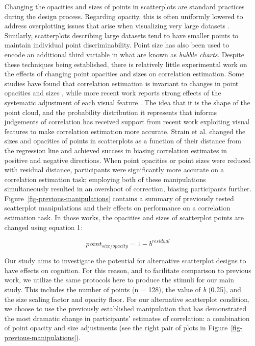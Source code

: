 \documentclass[manuscript,screen,review,anonymous]{acmart}
\begin{document}
Changing the opacities and sizes of points in scatterplots are standard
practices during the design process. Regarding opacity, this is often
uniformly lowered to address overplotting issues that arise when
visualizing very large datasets \citep{matejka_2015}. Similarly,
scatterplots describing large datasets tend to have smaller points to
maintain individual point discriminability. Point size has also been
used to encode an additional third variable in what are known as
\emph{bubble charts}. Despite these techniques being established, there
is relatively little experimental work on the effects of changing point
opacities and sizes on correlation estimation. Some studies have found
that correlation estimation is invariant to changes in point opacities
and sizes \citep{rensink_2014, rensink_2017}, while more recent work
reports strong effects of the systematic adjustment of each visual
feature \citep{strain_2023, strain_2023b, strain_2024}. The idea that it
is the shape of the point cloud, and the probability distribution it
represents that informs judgements of correlation has received support
from recent work exploiting visual features to make correlation
estimation more accurate. Strain et al.
\citep{strain_2023, strain_2023b, strain_2024} changed the sizes and
opacities of points in scatterplots as a function of their distance from
the regression line and achieved success in biasing correlation
estimates in positive and negative directions. When point opacities
\citep{strain_2023} or point sizes \citep{strain_2023b} were reduced
with residual distance, participants were significantly more accurate on
a correlation estimation task; employing both of these manipulations
simultaneously \citep{strain_2024} resulted in an overshoot of
correction, biasing participants further.
Figure~\ref{fig-previous-manipulations} contains a summary of previously
tested scatterplot manipulations and their effects on performance on a
correlation estimation task. In those works, the opacities and sizes of
scatterplot points are changed using equation 1:

\begin{equation}
  point_{size/opacity} = 1 - b^{residual}
\end{equation}

Our study aims to investigate the potential for alternative scatterplot
designs to have effects on cognition. For this reason, and to facilitate
comparison to previous work, we utilize the same protocols here to
produce the stimuli for our main study. This includes the number of
points (n = 128), the value of \emph{b} (0.25), and the size scaling
factor and opacity floor. For our alternative scatterplot condition, we
choose to use the previously established manipulation that has
demonstrated the most dramatic change in participants' estimates of
correlation: a combination of point opacity and size adjustments
\citep{strain_2024} (see the right pair of plots in
Figure~\ref{fig-previous-manipulations}).
\end{document}

